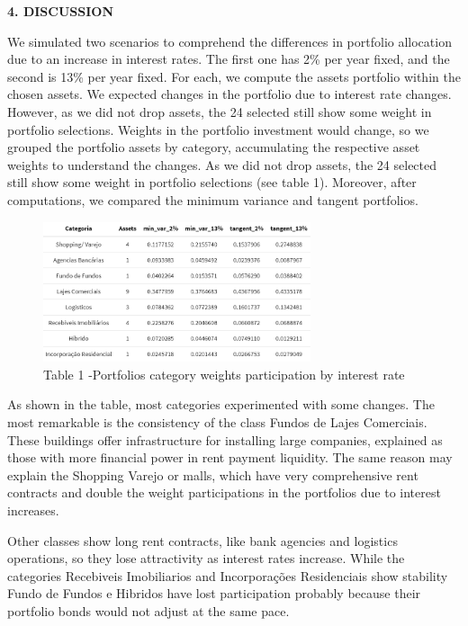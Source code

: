 \documentclass[
]{article}
\begin{document}
\newpage

\begin{center}
\textbf{4. DISCUSSION}
\end{center}

We simulated two scenarios to comprehend the differences in portfolio
allocation due to an increase in interest rates. The first one has 2\%
per year fixed, and the second is 13\% per year fixed. For each, we
compute the assets portfolio within the chosen assets. We expected
changes in the portfolio due to interest rate changes. However, as we
did not drop assets, the 24 selected still show some weight in portfolio
selections. Weights in the portfolio investment would change, so we
grouped the portfolio assets by category, accumulating the respective
asset weights to understand the changes. As we did not drop assets, the
24 selected still show some weight in portfolio selections (see table
1). Moreover, after computations, we compared the minimum variance and
tangent portfolios.

\begin{figure}

{\centering \includegraphics[width=0.7\textwidth,height=\textheight]{images/categorias.png}

}

\caption{Table 1 -Portfolios category weights participation by interest
rate}

\end{figure}

As shown in the table, most categories experimented with some changes.
The most remarkable is the consistency of the class Fundos de Lajes
Comerciais. These buildings offer infrastructure for installing large
companies, explained as those with more financial power in rent payment
liquidity. The same reason may explain the Shopping Varejo or malls,
which have very comprehensive rent contracts and double the weight
participations in the portfolios due to interest increases.

Other classes show long rent contracts, like bank agencies and logistics
operations, so they lose attractivity as interest rates increase. While
the categories Recebiveis Imobiliarios and Incorporações Residenciais
show stability Fundo de Fundos e Hibridos have lost participation
probably because their portfolio bonds would not adjust at the same
pace.
\end{document}

